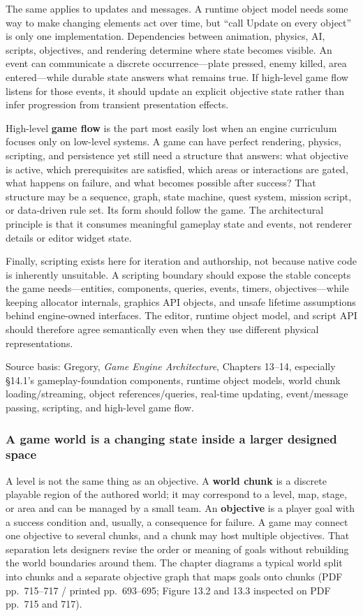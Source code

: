 The same applies to updates and messages. A runtime object model needs some way to make changing elements act over time, but ``call Update on every object'' is only one implementation. Dependencies between animation, physics, AI, scripts, objectives, and rendering determine where state becomes visible. An event can communicate a discrete occurrence---plate pressed, enemy killed, area entered---while durable state answers what remains true. If high-level game flow listens for those events, it should update an explicit objective state rather than infer progression from transient presentation effects.

High-level \textbf{game flow} is the part most easily lost when an engine curriculum focuses only on low-level systems. A game can have perfect rendering, physics, scripting, and persistence yet still need a structure that answers: what objective is active, which prerequisites are satisfied, which areas or interactions are gated, what happens on failure, and what becomes possible after success? That structure may be a sequence, graph, state machine, quest system, mission script, or data-driven rule set. Its form should follow the game. The architectural principle is that it consumes meaningful gameplay state and events, not renderer details or editor widget state.

Finally, scripting exists here for iteration and authorship, not because native code is inherently unsuitable. A scripting boundary should expose the stable concepts the game needs---entities, components, queries, events, timers, objectives---while keeping allocator internals, graphics API objects, and unsafe lifetime assumptions behind engine-owned interfaces. The editor, runtime object model, and script API should therefore agree semantically even when they use different physical representations.

Source basis: Gregory, \emph{Game Engine Architecture}, Chapters 13--14, especially §14.1's gameplay-foundation components, runtime object models, world chunk loading/streaming, object references/queries, real-time updating, event/message passing, scripting, and high-level game flow.

\subsubsection{A game world is a changing state inside a larger designed space}\label{a-game-world-is-a-changing-state-inside-a-larger-designed-space}

A level is not the same thing as an objective. A \textbf{world chunk} is a discrete playable region of the authored world; it may correspond to a level, map, stage, or area and can be managed by a small team. An \textbf{objective} is a player goal with a success condition and, usually, a consequence for failure. A game may connect one objective to several chunks, and a chunk may host multiple objectives. That separation lets designers revise the order or meaning of goals without rebuilding the world boundaries around them. The chapter diagrams a typical world split into chunks and a separate objective graph that maps goals onto chunks (PDF pp.~715--717 / printed pp.~693--695; Figure 13.2 and 13.3 inspected on PDF pp.~715 and 717).

